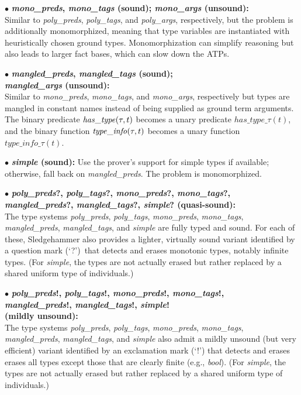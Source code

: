\documentclass[a4paper,12pt]{article}
\begin{document}
\begin{enum}
\begin{enum}
\item[$\bullet$]
\textbf{%
\textit{mono\_preds}, \textit{mono\_tags} (sound);
\textit{mono\_args} (unsound):} \\
Similar to \textit{poly\_preds}, \textit{poly\_tags}, and \textit{poly\_args},
respectively, but the problem is additionally monomorphized, meaning that type
variables are instantiated with heuristically chosen ground types.
Monomorphization can simplify reasoning but also leads to larger fact bases,
which can slow down the ATPs.

\item[$\bullet$]
\textbf{%
\textit{mangled\_preds},
\textit{mangled\_tags} (sound); \\
\textit{mangled\_args} (unsound):} \\
Similar to
\textit{mono\_preds}, \textit{mono\_tags}, and \textit{mono\_args},
respectively but types are mangled in constant names instead of being supplied
as ground term arguments. The binary predicate $\mathit{has\_type\/}(\tau, t)$
becomes a unary predicate $\mathit{has\_type\_}\tau(t)$, and the binary function
$\mathit{type\_info\/}(\tau, t)$ becomes a unary function
$\mathit{type\_info\_}\tau(t)$.

\item[$\bullet$] \textbf{\textit{simple} (sound):} Use the prover's support for
simple types if available; otherwise, fall back on \textit{mangled\_preds}. The
problem is monomorphized.

\item[$\bullet$]
\textbf{%
\textit{poly\_preds}?, \textit{poly\_tags}?, \textit{mono\_preds}?, \textit{mono\_tags}?, \\
\textit{mangled\_preds}?, \textit{mangled\_tags}?, \textit{simple}? (quasi-sound):} \\
The type systems \textit{poly\_preds}, \textit{poly\_tags},
\textit{mono\_preds}, \textit{mono\_tags}, \textit{mangled\_preds},
\textit{mangled\_tags}, and \textit{simple} are fully typed and sound. For each
of these, Sledgehammer also provides a lighter, virtually sound variant
identified by a question mark (`{?}')\ that detects and erases monotonic types,
notably infinite types. (For \textit{simple}, the types are not actually erased
but rather replaced by a shared uniform type of individuals.)

\item[$\bullet$]
\textbf{%
\textit{poly\_preds}!, \textit{poly\_tags}!, \textit{mono\_preds}!, \textit{mono\_tags}!, \\
\textit{mangled\_preds}!, \textit{mangled\_tags}!, \textit{simple}! \\
(mildly unsound):} \\
The type systems \textit{poly\_preds}, \textit{poly\_tags},
\textit{mono\_preds}, \textit{mono\_tags}, \textit{mangled\_preds},
\textit{mangled\_tags}, and \textit{simple} also admit a mildly unsound (but
very efficient) variant identified by an exclamation mark (`{!}') that detects
and erases erases all types except those that are clearly finite (e.g.,
\textit{bool}). (For \textit{simple}, the types are not actually erased but
rather replaced by a shared uniform type of individuals.)


\end{enum}
\end{enum}
\end{document}
